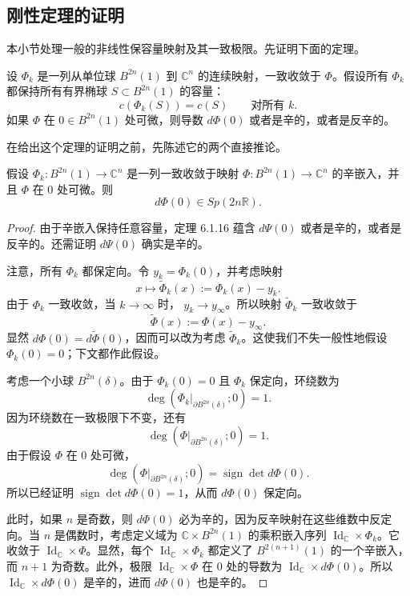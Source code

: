 \subsection{刚性定理的证明}
\label{subsec:proof-c0-rigidity}

本小节处理一般的非线性保容量映射及其一致极限。先证明下面的定理。

\begin{theorem}\label{thm:uniform-limit-capacity-maps-derivative}
设 $\Phi_k$ 是一列从单位球 $B^{2n}(1)$ 到 $\mathbb C^n$ 的连续映射，一致收敛于 $\Phi$。假设所有 $\Phi_k$ 都保持所有有界椭球
$S\subset B^{2n}(1)$ 的容量：
\[
 c(\Phi_k(S))=c(S)\qquad\text{对所有 }k.
\]
如果 $\Phi$ 在 $0\in B^{2n}(1)$ 处可微，则导数 $d\Phi(0)$ 或者是辛的，或者是反辛的。
\end{theorem}

在给出这个定理的证明之前，先陈述它的两个直接推论。

\begin{corollary}\label{cor:uniform-limit-symplectic-embeddings-derivative}
假设 $\Phi_k:B^{2n}(1)\to\mathbb C^n$ 是一列一致收敛于映射
$\Phi:B^{2n}(1)\to\mathbb C^n$ 的辛嵌入，并且 $\Phi$ 在 $0$ 处可微。则
\[
 d\Phi(0)\in Sp(2n\mathbb R).
\]
\end{corollary}

\begin{proof}
由于辛嵌入保持任意容量，定理 6.1.16 蕴含 $d\Psi(0)$ 或者是辛的，或者是反辛的。还需证明 $d\Psi(0)$ 确实是辛的。

注意，所有 $\Phi_k$ 都保定向。令 $y_k=\Phi_k(0)$，并考虑映射
\[
 x\longmapsto\widetilde\Phi_k(x):=\Phi_k(x)-y_k.
\]
由于 $\Phi_k$ 一致收敛，当 $k\to\infty$ 时，
$y_k\to y_\infty$。所以映射 $\widetilde\Phi_k$ 一致收敛于
\[
 \widetilde\Phi(x):=\Phi(x)-y_\infty.
\]
显然 $d\Phi(0)=d\widetilde\Phi(0)$，因而可以改为考虑
$\widetilde\Phi_k$。这使我们不失一般性地假设 $\Phi_k(0)=0$；下文都作此假设。

考虑一个小球 $B^{2n}(\delta)$。由于 $\Phi_k(0)=0$ 且
$\Phi_k$ 保定向，环绕数为
\[
 \deg(\Phi_k|_{\partial B^{2n}(\delta)};0)=1.
\]
因为环绕数在一致极限下不变，还有
\[
 \deg(\Phi|_{\partial B^{2n}(\delta)};0)=1.
\]
由于假设 $\Phi$ 在 $0$ 处可微，
\[
 \deg(\Phi|_{\partial B^{2n}(\delta)};0)
 =\operatorname{sign}\det d\Phi(0).
\]
所以已经证明 $\operatorname{sign}\det d\Phi(0)=1$，从而
$d\Phi(0)$ 保定向。

此时，如果 $n$ 是奇数，则 $d\Phi(0)$ 必为辛的，因为反辛映射在这些维数中反定向。当 $n$ 是偶数时，考虑定义域为
$\mathbb C\times B^{2n}(1)$ 的乘积嵌入序列
$\operatorname{Id}_{\mathbb C}\times\Phi_k$。它收敛于
$\operatorname{Id}_{\mathbb C}\times\Phi$。显然，每个
$\operatorname{Id}_{\mathbb C}\times\Phi_k$ 都定义了
$B^{2(n+1)}(1)$ 的一个辛嵌入，而 $n+1$ 为奇数。此外，极限
$\operatorname{Id}_{\mathbb C}\times\Phi$ 在 $0$ 处的导数为
$\operatorname{Id}_{\mathbb C}\times d\Phi(0)$。所以
$\operatorname{Id}_{\mathbb C}\times d\Phi(0)$ 是辛的，进而
$d\Phi(0)$ 也是辛的。
\end{proof}

